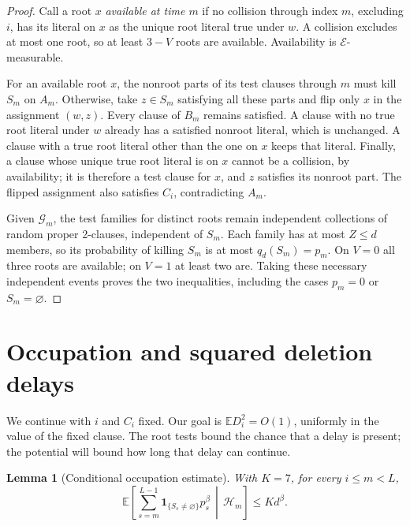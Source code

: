 \documentclass[11pt]{article}
\newtheorem{lemma}[theorem]{Lemma}
\theoremstyle{remark}
\newcommand{\E}{\mathbb E}
\newcommand{\ind}{\mathbf 1}
\newcommand{\cE}{\mathcal E}
\newcommand{\cG}{\mathcal G}
\newcommand{\cH}{\mathcal H}
\numberwithin{equation}{section}
\begin{document}
\begin{proof}
Call a root $x$ \emph{available at time $m$} if no collision through
index $m$, excluding $i$, has its literal on $x$ as the unique root
literal true under $w$. A collision excludes at most one root, so at
least $3-V$ roots are available. Availability is $\cE$-measurable.

For an available root $x$, the nonroot parts of its test clauses through
$m$ must kill $S_m$ on $A_m$. Otherwise, take $z\in S_m$ satisfying
all these parts and flip only $x$ in the assignment $(w,z)$.
Every clause of $B_m$ remains satisfied. A clause with no true root
literal under $w$ already has a satisfied nonroot literal, which is
unchanged. A clause with a true root literal other than the one on $x$
keeps that literal. Finally, a clause whose unique true root literal
is on $x$ cannot be a collision, by availability; it is therefore a
test clause for $x$, and $z$ satisfies its nonroot part.
The flipped assignment also satisfies $C_i$, contradicting $A_m$.

Given $\cG_m$, the test families for distinct roots remain independent
collections of random proper 2-clauses, independent of $S_m$.
Each family has at most $Z\le d$ members, so its probability of killing
$S_m$ is at most $q_d(S_m)=p_m$. On $V=0$ all three roots are available;
on $V=1$ at least two are. Taking these necessary independent events
proves the two inequalities, including the cases $p_m=0$ or
$S_m=\varnothing$.
\end{proof}

\section{Occupation and squared deletion delays}
\label{sec:occupation}

We continue with $i$ and $C_i$ fixed. Our goal is $\E D_i^2=O(1)$,
uniformly in the value of the fixed clause. The root tests bound the
chance that a delay is present; the potential will bound how long
that delay can continue.

\begin{lemma}[Conditional occupation estimate]
\label{lem:occupation}
With $K=7$, for every $i\le m<L$,
\begin{equation}
 \E\left[\sum_{s=m}^{L-1}\ind_{\{S_s\ne\varnothing\}}p_s^\beta
                         \,\middle|\,\cH_m\right]
 \le Kd^\beta.
 \label{eq:occupation}
\end{equation}
\end{lemma}
\end{document}
